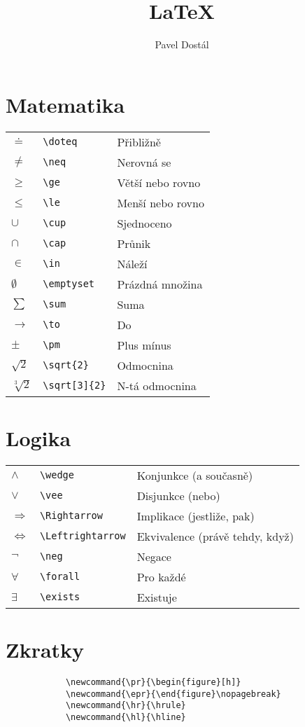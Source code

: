 \documentclass{article}
\title{LaTeX}
\author{Pavel Dostál}
\newcommand{\hl}{\hline}
\begin{document}
	\pagestyle{empty}
	\tableofcontents
\newpage
	\pagestyle{plain}
	\setcounter{page}{1}
	\begin{multicols}{2}
		\section{Matematika}
		\begin{tabular}{lll}
			$\doteq$		&	\verb|\doteq|		&	Přibližně			\\
			$\neq$		&	\verb|\neq|		&	Nerovná se		\\
			$\ge$		&	\verb|\ge|			&	Větší nebo rovno	\\
			$\le$			&	\verb|\le|			&	Menší nebo rovno	\\
			$\cup$		&	\verb|\cup|			&	Sjednoceno		\\
			$\cap$		&	\verb|\cap|			&	Průnik			\\
			$\in$			&	\verb|\in|			&	Náleží			\\
			$\emptyset$	&	\verb|\emptyset|	&	Prázdná množina	\\
			$\sum$		&	\verb|\sum|		&	Suma			\\
			$\to$			&	\verb|\to|			&	Do				\\
			$\pm$		&	\verb|\pm|			&	Plus mínus		\\
			$\sqrt{2}$		&	\verb|\sqrt{2}|		&	Odmocnina		\\
			$\sqrt[3]{2}$	&	\verb|\sqrt[3]{2}|	&	N-tá odmocnina	
		\end{tabular}
		\section{Logika}
		\begin{tabular}{lll}
			$\wedge$			&	\verb|\wedge|			&	Konjunkce (a současně)			\\
			$\vee$			&	\verb|\vee|				&	Disjunkce (nebo)				\\
			$\Rightarrow$		&	\verb|\Rightarrow|		&	Implikace (jestliže, pak)			\\
			$\Leftrightarrow$	&	\verb|\Leftrightarrow|		&	Ekvivalence (právě tehdy, když)	\\
			$\neg$			&	\verb|\neg|			&	Negace						\\
			$\forall$			&	\verb|\forall|			&	Pro každé						\\
			$\exists$			&	\verb|\exists|			&	Existuje 
		\end{tabular}
		\columnbreak
		\section{Zkratky}
		\begin{verbatim}
			\newcommand{\pr}{\begin{figure}[h]}
			\newcommand{\epr}{\end{figure}\nopagebreak}
			\newcommand{\hr}{\hrule}
			\newcommand{\hl}{\hline}
		\end{verbatim}

\end{multicols}
\end{document}
